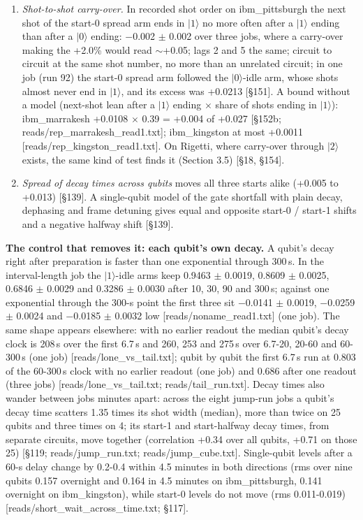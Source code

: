 \documentclass[11pt]{article}
\begin{document}
\begin{enumerate}
\item \emph{Shot-to-shot carry-over.} In recorded shot order on ibm\_pittsburgh the next shot of the start-0 spread arm ends in \(|1\rangle\) no more often after a \(|1\rangle\) ending than after a \(|0\rangle\) ending: \(-\)0.002 \(\pm\) 0.002 over three jobs, where a carry-over making the +2.0\% would read \(\sim\)+0.05; lags 2 and 5 the same; circuit to circuit at the same shot number, no more than an unrelated circuit; in one job (run 92) the start-0 spread arm followed the \(|0\rangle\)-idle arm, whose shots almost never end in \(|1\rangle\), and its excess was +0.0213 {[}\S{}151{]}. A bound without a model (next-shot lean after a \(|1\rangle\) ending \(\times\) share of shots ending in \(|1\rangle\)): ibm\_marrakesh +0.0108 \(\times\) 0.39 = +0.004 of +0.027 {[}\S{}152b; reads/rep\_marrakesh\_read1.txt{]}; ibm\_kingston at most +0.0011 {[}reads/rep\_kingston\_read1.txt{]}. On Rigetti, where carry-over through \(|2\rangle\) exists, the same kind of test finds it (Section 3.5) {[}\S{}18, \S{}154{]}.
\item \emph{Spread of decay times across qubits} moves all three starts alike (+0.005 to +0.013) {[}\S{}139{]}. A single-qubit model of the gate shortfall with plain decay, dephasing and frame detuning gives equal and opposite start-0 / start-1 shifts and a negative halfway shift {[}\S{}139{]}.
\end{enumerate}
\textbf{The control that removes it: each qubit's own decay.} A qubit's decay right after preparation is faster than one exponential through 300\,\textmu s. In the interval-length job the \(|1\rangle\)-idle arms keep 0.9463 \(\pm\) 0.0019, 0.8609 \(\pm\) 0.0025, 0.6846 \(\pm\) 0.0029 and 0.3286 \(\pm\) 0.0030 after 10, 30, 90 and 300\,\textmu s; against one exponential through the 300-\textmu s point the first three sit \(-\)0.0141 \(\pm\) 0.0019, \(-\)0.0259 \(\pm\) 0.0024 and \(-\)0.0185 \(\pm\) 0.0032 low {[}reads/noname\_read1.txt{]} (one job). The same shape appears elsewhere: with no earlier readout the median qubit's decay clock is 208\,\textmu s over the first 6.7\,\textmu s and 260, 253 and 275\,\textmu s over 6.7-20, 20-60 and 60-300\,\textmu s (one job) {[}reads/lone\_vs\_tail.txt{]}; qubit by qubit the first 6.7\,\textmu s run at 0.803 of the 60-300\,\textmu s clock with no earlier readout (one job) and 0.686 after one readout (three jobs) {[}reads/lone\_vs\_tail.txt; reads/tail\_run.txt{]}. Decay times also wander between jobs minutes apart: across the eight jump-run jobs a qubit's decay time scatters 1.35 times its shot width (median), more than twice on 25 qubits and three times on 4; its start-1 and start-halfway decay times, from separate circuits, move together (correlation +0.34 over all qubits, +0.71 on those 25) {[}\S{}119; reads/jump\_run.txt; reads/jump\_cube.txt{]}. Single-qubit levels after a 60-\textmu s delay change by 0.2-0.4 within 4.5 minutes in both directions (rms over nine qubits 0.157 overnight and 0.164 in 4.5 minutes on ibm\_pittsburgh, 0.141 overnight on ibm\_kingston), while start-0 levels do not move (rms 0.011-0.019) {[}reads/short\_wait\_across\_time.txt; \S{}117{]}.
\end{document}
